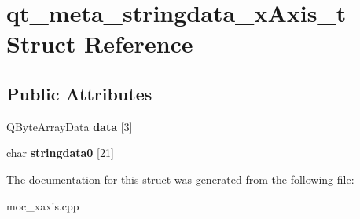 \hypertarget{structqt__meta__stringdata__x_axis__t}{}\section{qt\+\_\+meta\+\_\+stringdata\+\_\+x\+Axis\+\_\+t Struct Reference}
\label{structqt__meta__stringdata__x_axis__t}
\subsection*{Public Attributes}
\begin{DoxyCompactItemize}
\item 
\mbox{\label{structqt__meta__stringdata__x_axis__t_a45983c985fb10e170dca64d938efcf5c}} 
Q\+Byte\+Array\+Data {\bfseries data} \mbox{[}3\mbox{]}
\item 
\mbox{\label{structqt__meta__stringdata__x_axis__t_a3aaaacb85dc28ef0847146702318dab4}} 
char {\bfseries stringdata0} \mbox{[}21\mbox{]}
\end{DoxyCompactItemize}


The documentation for this struct was generated from the following file\+:\begin{DoxyCompactItemize}
\item 
moc\+\_\+xaxis.\+cpp\end{DoxyCompactItemize}

